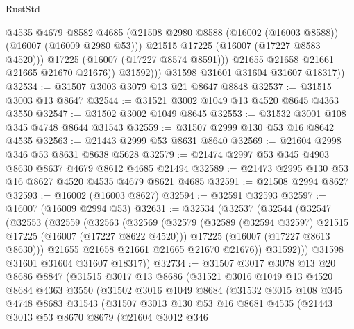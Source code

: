 \begin{lexlean}{RustStd}
\begin{coremodule}
                      @4535
                      @4679
                      @8582
                      @4685
                      (@21508 @2980 @8588 (@16002 (@16003 @8588)) (@16007 (@16009 @2980 @53)))
                      @21515
                      @17225
                      (@16007 (@17227 @8583 @4520)))
                    @17225
                    (@16007 (@17227 @8574 @8591)))
                  @21655
                  @21658
                  @21661
                  @21665
                  @21670
                  @21676))
              @31592)))
        @31598
        @31601
        @31604
        @31607
        @18317))
@32534 := @31507 @3003 @3079 @13 @21 @8647 @8848
@32537 := @31515 @3003 @13 @8647
@32544 := @31521 @3002 @1049 @13 @4520 @8645 @4363 @3550
@32547 := @31502 @3002 @1049 @8645
@32553 := @31532 @3001 @108 @345 @4748 @8644 @31543
@32559 := @31507 @2999 @130 @53 @16 @8642 @4535
@32563 := @21443 @2999 @53 @8631 @8640
@32569 := @21604 @2998 @346 @53 @8631 @8638 @5628
@32579 := @21474 @2997 @53 @345 @4903 @8630 @8637 @4679 @8612 @4685 @21494
@32589 := @21473 @2995 @130 @53 @16 @8627 @4520 @4535 @4679 @8621 @4685
@32591 := @21508 @2994 @8627
@32593 := @16002 (@16003 @8627)
@32594 := @32591 @32593
@32597 := @16007 (@16009 @2994 @53)
@32631 := @32534
    (@32537
      (@32544
        (@32547
          (@32553
            (@32559
              (@32563
                (@32569
                  (@32579
                    (@32589 (@32594 @32597) @21515 @17225 (@16007 (@17227 @8622 @4520)))
                    @17225
                    (@16007 (@17227 @8613 @8630)))
                  @21655
                  @21658
                  @21661
                  @21665
                  @21670
                  @21676))
              @31592)))
        @31598
        @31601
        @31604
        @31607
        @18317))
@32734 := @31507
    @3017
    @3078
    @13
    @20
    @8686
    @8847
    (@31515
      @3017
      @13
      @8686
      (@31521
        @3016
        @1049
        @13
        @4520
        @8684
        @4363
        @3550
        (@31502
          @3016
          @1049
          @8684
          (@31532
            @3015
            @108
            @345
            @4748
            @8683
            @31543
            (@31507
              @3013
              @130
              @53
              @16
              @8681
              @4535
              (@21443
                @3013
                @53
                @8670
                @8679
                (@21604
                  @3012
                  @346

\end{coremodule}
\end{lexlean}

